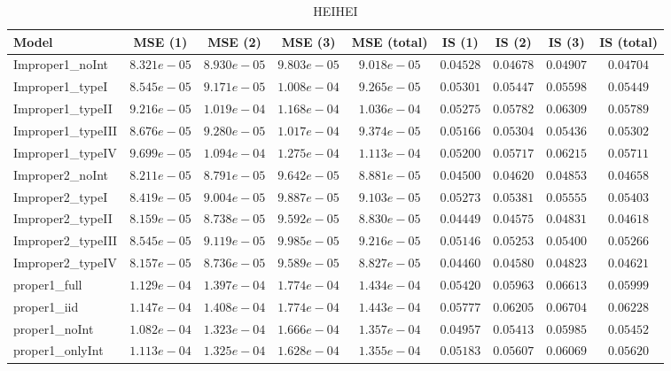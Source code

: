\begin{table}

\caption{\label{tab:model-choice-sc1}HEIHEI}
\centering
\begin{tabular}{lcccccccc}
\hline
Model  & MSE (1) & MSE (2) & MSE (3) & MSE (total) & IS (1) & IS (2) & IS (3) & \multicolumn{1}{c}{IS (total)} \\ 
\hline
Improper1_noInt  & $8.321e-05$ & $8.930e-05$ & $9.803e-05$ & $9.018e-05$ & $0.04528$ & $0.04678$ & $0.04907$ & $0.04704$ \\
Improper1_typeI  & $8.545e-05$ & $9.171e-05$ & $1.008e-04$ & $9.265e-05$ & $0.05301$ & $0.05447$ & $0.05598$ & $0.05449$ \\
Improper1_typeII  & $9.216e-05$ & $1.019e-04$ & $1.168e-04$ & $1.036e-04$ & $0.05275$ & $0.05782$ & $0.06309$ & $0.05789$ \\
Improper1_typeIII  & $8.676e-05$ & $9.280e-05$ & $1.017e-04$ & $9.374e-05$ & $0.05166$ & $0.05304$ & $0.05436$ & $0.05302$ \\
Improper1_typeIV  & $9.699e-05$ & $1.094e-04$ & $1.275e-04$ & $1.113e-04$ & $0.05200$ & $0.05717$ & $0.06215$ & $0.05711$ \\
Improper2_noInt  & $8.211e-05$ & $8.791e-05$ & $9.642e-05$ & $8.881e-05$ & $0.04500$ & $0.04620$ & $0.04853$ & $0.04658$ \\
Improper2_typeI  & $8.419e-05$ & $9.004e-05$ & $9.887e-05$ & $9.103e-05$ & $0.05273$ & $0.05381$ & $0.05555$ & $0.05403$ \\
Improper2_typeII  & $8.159e-05$ & $8.738e-05$ & $9.592e-05$ & $8.830e-05$ & $0.04449$ & $0.04575$ & $0.04831$ & $0.04618$ \\
Improper2_typeIII  & $8.545e-05$ & $9.119e-05$ & $9.985e-05$ & $9.216e-05$ & $0.05146$ & $0.05253$ & $0.05400$ & $0.05266$ \\
Improper2_typeIV  & $8.157e-05$ & $8.736e-05$ & $9.589e-05$ & $8.827e-05$ & $0.04460$ & $0.04580$ & $0.04823$ & $0.04621$ \\
proper1_full  & $1.129e-04$ & $1.397e-04$ & $1.774e-04$ & $1.434e-04$ & $0.05420$ & $0.05963$ & $0.06613$ & $0.05999$ \\
proper1_iid  & $1.147e-04$ & $1.408e-04$ & $1.774e-04$ & $1.443e-04$ & $0.05777$ & $0.06205$ & $0.06704$ & $0.06228$ \\
proper1_noInt  & $1.082e-04$ & $1.323e-04$ & $1.666e-04$ & $1.357e-04$ & $0.04957$ & $0.05413$ & $0.05985$ & $0.05452$ \\
proper1_onlyInt  & $1.113e-04$ & $1.325e-04$ & $1.628e-04$ & $1.355e-04$ & $0.05183$ & $0.05607$ & $0.06069$ & $0.05620$ \\

\end{tabular}
\end{table}
